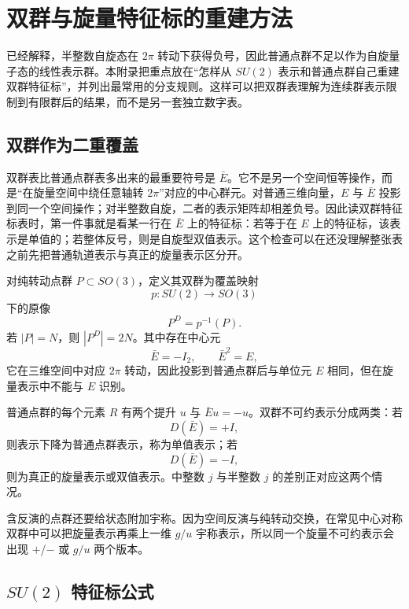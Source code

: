 \chapter{双群与旋量特征标的重建方法}
\label{app:double-groups}

已经解释，半整数自旋态在 $2\pi$ 转动下获得负号，因此普通点群不足以作为自旋量子态的线性表示群。本附录把重点放在“怎样从 $SU(2)$ 表示和普通点群自己重建双群特征标”，并列出最常用的分支规则。这样可以把双群表理解为连续群表示限制到有限群后的结果，而不是另一套独立数字表。

\section{双群作为二重覆盖}

双群表比普通点群表多出来的最重要符号是 $\bar E$。它不是另一个空间恒等操作，而是“在旋量空间中绕任意轴转 $2\pi$”对应的中心群元。对普通三维向量，$E$ 与 $\bar E$ 投影到同一个空间操作；对半整数自旋，二者的表示矩阵却相差负号。因此读双群特征标表时，第一件事就是看某一行在 $\bar E$ 上的特征标：若等于在 $E$ 上的特征标，该表示是单值的；若整体反号，则是自旋型双值表示。这个检查可以在还没理解整张表之前先把普通轨道表示与真正的旋量表示区分开。


对纯转动点群 $P\subset SO(3)$，定义其双群为覆盖映射
\[
p:SU(2)\longrightarrow SO(3)
\]
下的原像
\begin{equation}
P^D=p^{-1}(P).
\label{eq:double-point-preimage}
\end{equation}
若 $|P|=N$，则 $|P^D|=2N$。其中存在中心元
\[
\bar E=-I_2,
\qquad
\bar E^2=E,
\]
它在三维空间中对应 $2\pi$ 转动，因此投影到普通点群后与单位元 $E$ 相同，但在旋量表示中不能与 $E$ 识别。

普通点群的每个元素 $R$ 有两个提升 $u$ 与 $\bar E u=-u$。双群不可约表示分成两类：若
\[
D(\bar E)=+I,
\]
则表示下降为普通点群表示，称为单值表示；若
\[
D(\bar E)=-I,
\]
则为真正的旋量表示或双值表示。中整数 $j$ 与半整数 $j$ 的差别正对应这两个情况。

含反演的点群还要给状态附加宇称。因为空间反演与纯转动交换，在常见中心对称双群中可以把旋量表示再乘上一维 $g/u$ 宇称表示，所以同一个旋量不可约表示会出现 $+$/$-$ 或 $g/u$ 两个版本。

\section{\texorpdfstring{$SU(2)$ 特征标公式}{SU(2) 特征标公式}}

